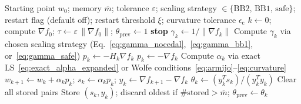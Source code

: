 \begin{algorithm}[H]
\caption{Enhanced L-BFGS~\cite[Algorithm~9.2]{nocedal2006numerical}}
\label{alg:lbfgs}
\begin{algorithmic}[1]
    \Require Starting point $w_0$; memory $\bar{m}$; tolerance $\varepsilon$;
             scaling strategy $\in \{\mathrm{BB2},\,\mathrm{BB1},\,\mathrm{safe}\}$;
             restart flag (default off); restart threshold $\xi$; curvature tolerance $\epsilon_{\mathrm{c}}$
    \State $k \gets 0$;\; compute $\nabla f_0$;\;
           $\tau \gets \varepsilon\,\|\nabla f_0\|$;\;
           $\theta_{\mathrm{prev}} \gets 1$
            \State \textbf{stop}
        \EndIf
            \State $\gamma_k \gets 1/\|\nabla f_k\|$
        \Else
            \State Compute $\gamma_k$ via chosen scaling strategy
                   (Eq.~\eqref{eq:gamma_nocedal},~\eqref{eq:gamma_bb1},
                   or~\eqref{eq:gamma_safe})
        \EndIf
        \State $p_k \gets -H_k \nabla f_k$
            \State $p_k \gets -\nabla f_k$
        \EndIf
        \State Compute $\alpha_k$ via exact LS~\eqref{eq:exact_alpha_expanded}
               or Wolfe conditions~\eqref{eq:armijo}--\eqref{eq:curvature}
        \State $w_{k+1} \gets w_k + \alpha_k p_k$;\quad
               $s_k \gets \alpha_k p_k$;\quad
               $y_k \gets \nabla f_{k+1} - \nabla f_k$
            \State $\theta_k \gets (y_k^T s_k)/(y_k^T y_k)$
                \State Clear all stored pairs
            \EndIf
            \State Store $(s_k, y_k)$;\; discard oldest if
                   $\#\text{stored} > \bar{m}$;\;
                   $\theta_{\mathrm{prev}} \gets \theta_k$
                   


\end{algorithmic}
\end{algorithm}
